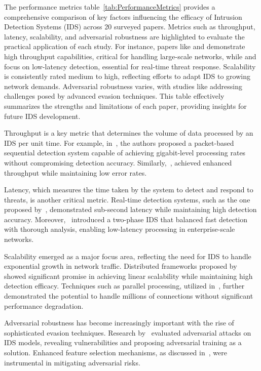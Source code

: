 The performance metrics table~\ref{tab:PerformanceMetrics} provides a comprehensive comparison of key factors influencing the efficacy of Intrusion Detection Systems (IDS) across 20 surveyed papers. Metrics such as throughput, latency, scalability, and adversarial robustness are highlighted to evaluate the practical application of each study. For instance, papers like \cite{vinayakumar2019deep} and \cite{Ghadermazi2024} demonstrate high throughput capabilities, critical for handling large-scale networks, while \cite{Jayalaxmi2022} and \cite{Roshan2024} focus on low-latency detection, essential for real-time threat response. Scalability is consistently rated medium to high, reflecting efforts to adapt IDS to growing network demands. Adversarial robustness varies, with studies like \cite{Alotaibi2023AML} addressing challenges posed by advanced evasion techniques. This table effectively summarizes the strengths and limitations of each paper, providing insights for future IDS development.

Throughput is a key metric that determines the volume of data processed by an IDS per unit time. For example, in~\cite{Ghadermazi2024}, the authors proposed a packet-based sequential detection system capable of achieving gigabit-level processing rates without compromising detection accuracy. Similarly,~\cite{Rele2023}, achieved enhanced throughput while maintaining low error rates.

Latency, which measures the time taken by the system to detect and respond to threats, is another critical metric. Real-time detection systems, such as the one proposed by~\cite{Jayalaxmi2022}, demonstrated sub-second latency while maintaining high detection accuracy. Moreover,~\cite{Roshan2024} introduced a two-phase IDS that balanced fast detection with thorough analysis, enabling low-latency processing in enterprise-scale networks.

Scalability emerged as a major focus area, reflecting the need for IDS to handle exponential growth in network traffic. Distributed frameworks proposed by~\cite{Islam2023} showed significant promise in achieving linear scalability while maintaining high detection efficacy. Techniques such as parallel processing, utilized in~\cite{Gutierrez2023}, further demonstrated the potential to handle millions of connections without significant performance degradation.

Adversarial robustness has become increasingly important with the rise of sophisticated evasion techniques. Research by~\cite{Alotaibi2023AML} evaluated adversarial attacks on IDS models, revealing vulnerabilities and proposing adversarial training as a solution. Enhanced feature selection mechanisms, as discussed in~\cite{Roshan2024}, were instrumental in mitigating adversarial risks.

